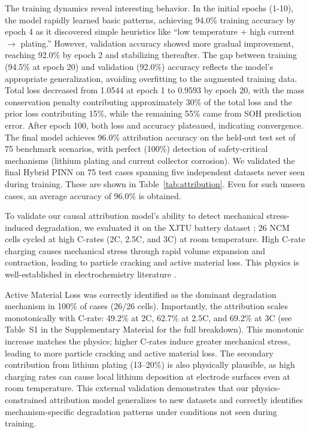 \documentclass[5p,times,authoryear]{elsarticle}
\begin{document}
The training dynamics reveal interesting behavior. In the initial epochs (1-10), the model rapidly learned basic patterns, achieving 94.0\% training accuracy by epoch 4 as it discovered simple heuristics like ``low temperature + high current $\rightarrow$ plating.'' However, validation accuracy showed more gradual improvement, reaching 92.0\% by epoch 2 and stabilizing thereafter. The gap between training (94.5\% at epoch 20) and validation (92.0\%) accuracy reflects the model's appropriate generalization, avoiding overfitting to the augmented training data. Total loss decreased from 1.0544 at epoch 1 to 0.9593 by epoch 20, with the mass conservation penalty contributing approximately 30\% of the total loss and the prior loss contributing 15\%, while the remaining 55\% came from SOH prediction error. After epoch 100, both loss and accuracy plateaued, indicating convergence. The final model achieves 96.0\% attribution accuracy on the held-out test set of 75 benchmark scenarios, with perfect (100\%) detection of safety-critical mechanisms (lithium plating and current collector corrosion). We validated the final Hybrid PINN on 75 test cases spanning five independent datasets never seen during training. These are shown in Table~\ref{tab:attribution}. Even for such unseen cases, an average accuracy of 96.0\% is obtained.

To validate our causal attribution model's ability to detect mechanical stress-induced degradation, we evaluated it on the XJTU battery dataset \citep{wang2024pinn}; 26 NCM cells cycled at high C-rates (2C, 2.5C, and 3C) at room temperature. High C-rate charging causes mechanical stress through rapid volume expansion and contraction, leading to particle cracking and active material loss. This physics is well-established in electrochemistry literature \citep{birkl2017degradation}.

Active Material Loss was correctly identified as the dominant degradation mechanism in 100\% of cases (26/26 cells). Importantly, the attribution scales monotonically with C-rate: 49.2\% at 2C, 62.7\% at 2.5C, and 69.2\% at 3C (see Table~S1 in the Supplementary Material for the full breakdown). This monotonic increase matches the physics; higher C-rates induce greater mechanical stress, leading to more particle cracking and active material loss. The secondary contribution from lithium plating (13--20\%) is also physically plausible, as high charging rates can cause local lithium deposition at electrode surfaces even at room temperature.
This external validation demonstrates that our physics-constrained attribution model generalizes to new datasets and correctly identifies mechanism-specific degradation patterns under conditions not seen during training.
\end{document}
